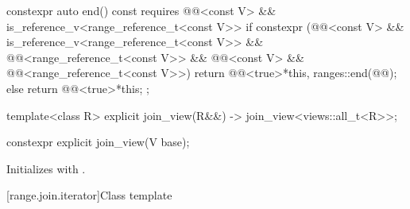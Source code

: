 \begin{codeblock}
{{    constexpr auto end() const
    requires @@<const V> &&
             is_reference_v<range_reference_t<const V>> {
      if constexpr (@@<const V> &&
                    is_reference_v<range_reference_t<const V>> &&
                    @@<range_reference_t<const V>> &&
                    @@<const V> &&
                    @@<range_reference_t<const V>>)
        return @@<true>{*this, ranges::end(@@)};
      else
        return @@<true>{*this};
    }
  };

  template<class R>
    explicit join_view(R&&) -> join_view<views::all_t<R>>;
}
\end{codeblock}

%
\begin{itemdecl}
constexpr explicit join_view(V base);
\end{itemdecl}

\begin{itemdescr}
\pnum
\effects
Initializes  with .
\end{itemdescr}

[range.join.iterator]{Class template }

